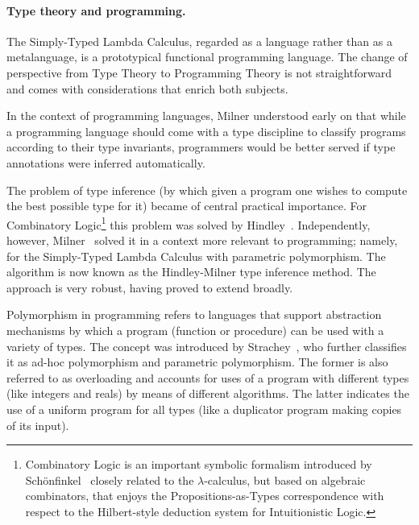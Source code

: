\documentclass[11pt,twocolumn]{article}
\newcommand{\lcalculus}{\mbox{$\lambda$-calculus}}
\begin{document}
\paragraph{Type theory and programming.}

The Simply-Typed Lambda Calculus, regarded as a language rather than as a
metalanguage, is a prototypical functional programming language.  The change
of perspective from Type Theory to Programming Theory is not straightforward
and comes with considerations that enrich both subjects.  

In the context of programming languages, Milner %
understood early on that while a programming language should come with a
type discipline to classify programs according to their type invariants,
programmers would be better served if type annotations were inferred
automatically.  

The problem of type inference (by which given a program one wishes to compute
the best possible type for it) became of central practical importance.  For
Combinatory Logic\footnote{Combinatory Logic is an important symbolic
  formalism introduced by Sch\"onfinkel~\cite{Schonfinkel} closely related
  to the {\lcalculus}, but based on algebraic combinators, that enjoys the
  Propositions-as-Types correspondence with respect to the Hilbert-style
  deduction system for Intuitionistic %
  Logic.} 
this problem was solved by Hindley~\cite{Hindley1969}.  Independently,
however, Milner~\cite{Milner1978} solved it in a context more relevant to
programming; namely, for the Simply-Typed Lambda Calculus with parametric
polymorphism.  The algorithm is now known as the Hindley-Milner type
inference method.  The approach is very robust, having proved to extend
broadly.  
 
Polymorphism in programming refers to languages that support abstraction
mechanisms by which a program (function or procedure) can be used with a
variety of types.  The concept was introduced by Strachey~\cite{Strachey1967},
who further classifies it as ad-hoc polymorphism and parametric polymorphism.
The former is also referred to as overloading and accounts for uses of a
program with different types (like integers and reals) by means of different
algorithms.  The latter indicates the use of a uniform program for all types
(like a duplicator program making copies of its input).
\end{document}

